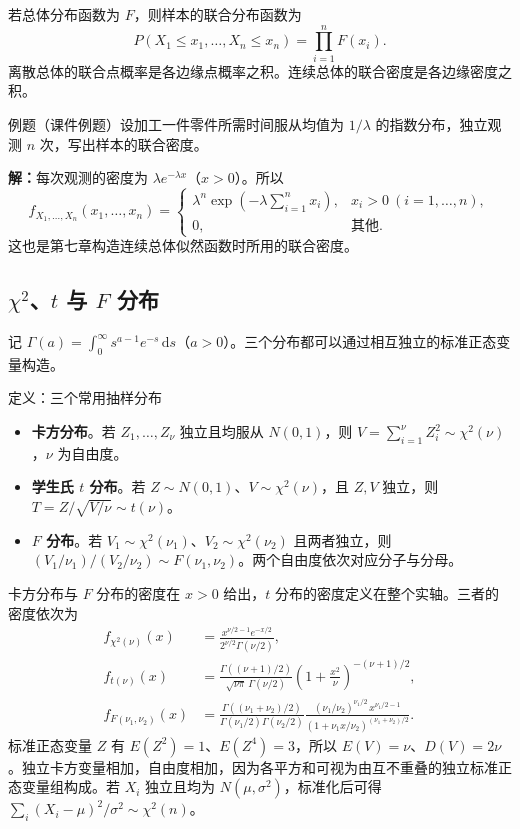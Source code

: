 \documentclass[UTF8,fontset=none,zihao=-4,a4paper]{ctexart}
\newcommand{\term}[1]{\textbf{#1}}
\newcommand{\example}[1]{\begin{infobox}{例题}#1\end{infobox}}
\newcommand{\solution}{\par\noindent\textbf{解：}}
\begin{document}
若总体分布函数为 $F$，则样本的联合分布函数为
\[
P(X_1\le x_1,\ldots,X_n\le x_n)=\prod_{i=1}^n F(x_i).
\]
离散总体的联合点概率是各边缘点概率之积。连续总体的联合密度是各边缘密度之积。

\example{（课件例题）设加工一件零件所需时间服从均值为 $1/\lambda$ 的指数分布，独立观测 $n$ 次，写出样本的联合密度。}
\solution 每次观测的密度为 $\lambda e^{-\lambda x}$（$x>0$）。所以
\[
f_{X_1,\ldots,X_n}(x_1,\ldots,x_n)=
\begin{cases}
\lambda^n\exp\!\left(-\lambda\displaystyle\sum_{i=1}^n x_i\right),
  & x_i>0\ (i=1,\ldots,n),\\
0,&\text{其他}.
\end{cases}
\]
这也是第七章构造连续总体似然函数时所用的联合密度。

\subsection{\texorpdfstring{$\chi^2$、$t$ 与 $F$ 分布}{卡方、t 与 F 分布}}
记 $\Gamma(a)=\int_0^\infty s^{a-1}e^{-s}\,\mathrm ds$（$a>0$）。三个分布都可以通过相互独立的标准正态变量构造。

\begin{infobox}{定义：三个常用抽样分布}
\begin{itemize}
\item \term{卡方分布}。若 $Z_1,\ldots,Z_\nu$ 独立且均服从 $N(0,1)$，则 $V=\sum_{i=1}^\nu Z_i^2\sim\chi^2(\nu)$，$\nu$ 为自由度。
\item \term{学生氏 $t$ 分布}。若 $Z\sim N(0,1)$、$V\sim\chi^2(\nu)$，且 $Z,V$ 独立，则 $T=Z/\sqrt{V/\nu}\sim t(\nu)$。
\item \term{$F$ 分布}。若 $V_1\sim\chi^2(\nu_1)$、$V_2\sim\chi^2(\nu_2)$ 且两者独立，则 $(V_1/\nu_1)/(V_2/\nu_2)\sim F(\nu_1,\nu_2)$。两个自由度依次对应分子与分母。
\end{itemize}
\end{infobox}
卡方分布与 $F$ 分布的密度在 $x>0$ 给出，$t$ 分布的密度定义在整个实轴。三者的密度依次为
\begin{align*}
f_{\chi^2(\nu)}(x)&=\frac{x^{\nu/2-1}e^{-x/2}}{2^{\nu/2}\Gamma(\nu/2)},\\
f_{t(\nu)}(x)&=\frac{\Gamma((\nu+1)/2)}{\sqrt{\nu\pi}\,\Gamma(\nu/2)}
  \left(1+\frac{x^2}{\nu}\right)^{-(\nu+1)/2},\\
f_{F(\nu_1,\nu_2)}(x)&=
  \frac{\Gamma((\nu_1+\nu_2)/2)}{\Gamma(\nu_1/2)\Gamma(\nu_2/2)}
  \frac{(\nu_1/\nu_2)^{\nu_1/2}\,x^{\nu_1/2-1}}
  {(1+\nu_1 x/\nu_2)^{(\nu_1+\nu_2)/2}}.
\end{align*}
标准正态变量 $Z$ 有 $E(Z^2)=1$、$E(Z^4)=3$，所以 $E(V)=\nu$、$D(V)=2\nu$。独立卡方变量相加，自由度相加，因为各平方和可视为由互不重叠的独立标准正态变量组构成。若 $X_i$ 独立且均为 $N(\mu,\sigma^2)$，标准化后可得 $\sum_i(X_i-\mu)^2/\sigma^2\sim\chi^2(n)$。
\end{document}
